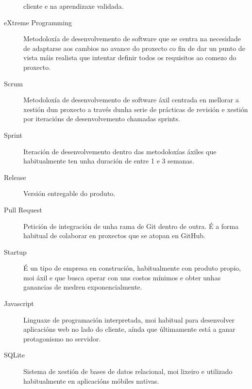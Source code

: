\begin{description}
cliente e na aprendizaxe validada.
 \item [eXtreme Programming] Metodoloxía de desenvolvemento de software que se 
centra na necesidade de adaptarse aos cambios no avance do proxecto co fin de 
dar un punto de vista máis realista que intentar definir todos os requisitos ao 
comezo do proxecto.
 \item [Scrum] Metodoloxía de desenvolvemento de software áxil centrada en 
mellorar a xestión dun proxecto a través dunha serie de prácticas de revisión 
e xestión por iteracións de desenvolvemento chamadas sprints.
 \item [Sprint] Iteración de desenvolvemento dentro das metodoloxías áxiles que 
habitualmente ten unha duración de entre 1 e 3 semanas.
 \item [Release] Versión entregable do produto.
 \item [Pull Request] Petición de integración de unha rama de Git dentro de 
outra. É a forma habitual de colaborar en proxectos que se atopan en GitHub.
 \item [Startup] É un tipo de empresa en construción, habitualmente con 
produto propio, moi áxil e que busca operar con uns costos mínimos e obter 
unhas ganancias de medren exponencialmente.
 \item [Javascript] Linguaxe de programación interpretada, moi habitual para 
desenvolver aplicacións web no lado do cliente, aínda que últimamente está a 
ganar protagonismo no servidor.
 \item [SQLite] Sistema de xestión de bases de datos relacional, moi lixeiro e 
utilizado habitualmente en aplicacións móbiles nativas.
\end{description}
